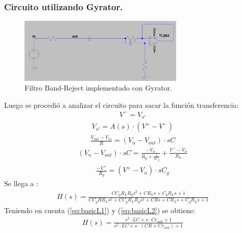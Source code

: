 \documentclass[a4paper]{article}
\begin{document}
\subsubsection{Circuito utilizando Gyrator.}
\begin{figure}[H]	
	\centering
	\includegraphics[width=0.7\textwidth]{ImagenesEj2/gyrBR.PNG}
	\caption{Filtro Band-Reject implementado con Gyrator.}
	\label{fig:gyrBR}
\end{figure}
Luego se procedió a analizar el circuito para sacar la función transferencia:
\begin{align}V^- = V_{o'}\end{align}
\begin{align}V_{o'} = A(s)\cdot (V^+-V^-)\end{align}
\begin{align}\frac{V_{out}-V_{in}}{R}=(V_n-V_{out})\cdot sC\end{align}
\begin{align}(V_n-V_{out})\cdot sC = \frac{-V_n}{R_g+\frac{1}{sC_g}}+\frac{V^--V_n}{R_L}\end{align}
\begin{align}\frac{-V^+}{R_g}=(V^+-V_n)\cdot sC_g\end{align}
Se llega a :
\begin{align}  H(s)=\frac{C C_{g} R_{L} R_{g} s^{2} + C R_{L} s + C_{g} R_{L} s + 1}{C C_{g} R R_{L} s^{2} + C C_{g} R_{L} R_{g} s^{2} + C R s + C R_{L} s + C_{g} R_{L} s + 1} \end{align}
Teniendo en cuenta (\ref{eq:basicL1}) y (\ref{eq:basicL2}) se obtiene:
\begin{align}  H(s)=\frac{ s^{2}\cdot  LC + s \cdot  C r_{coil} + 1}{ s^{2}\cdot LC + s\cdot (C R+Cr_{coil}) + 1} 
\label{eq:BRG}
\end{align}
\end{document}

